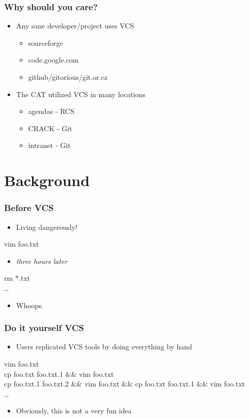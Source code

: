 \documentclass{beamer}
\begin{document}
\begin{frame}
    \frametitle{Why should you care?}
    \begin{itemize}
	\item Any sane developer/project uses VCS
	\begin{itemize}
	    \item sourceforge
	    \item code.google.com
	    \item github/gitorious/git.or.cz
	\end{itemize}
	\item The CAT utilized VCS in many locations
	\begin{itemize}
	    \item agendas - RCS
	    \item CRACK - Git
	    \item intranet - Git
	\end{itemize}
    \end{itemize}
\end{frame}

\section{Background}

\begin{frame}
    \frametitle{Before VCS}
    \begin{itemize}
	\item Living dangerously!
    \end{itemize}
    vim foo.txt \\
    \begin{itemize}
	\item {\em three hours later} \\
    \end{itemize}
    rm *.txt \\
    \ldots \\
    \begin{itemize}
	\item Whoops. \\
    \end{itemize}
\end{frame}

\begin{frame}
    \frametitle{Do it yourself VCS}
    \begin{itemize}
	\item Users replicated VCS tools by doing everything by hand
    \end{itemize}
     vim foo.txt \\
     cp foo.txt foo.txt.1 \&\& vim foo.txt \\
     cp foo.txt.1 foo.txt.2 \&\& vim foo.txt \&\& cp foo.txt foo.txt.1 \&\& vim foo.txt \\
    \ldots
    \begin{itemize}
	\item Obviously, this is not a very fun idea
    \end{itemize}
\end{frame}
\end{document}
